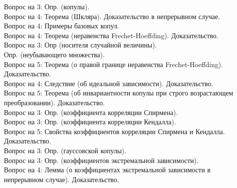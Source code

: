\documentclass[10pt]{amsart}
\begin{document}
\begin{enumerate}
\begin{enumerate}
Вопрос на 3: Опр. (копулы). \\
Вопрос на 4: Теорема (Шкляра). Доказательство в непрерывном случае. \\
Вопрос на 4: Примеры базовых копул. \\
Вопрос на 4: Теорема (неравенства Frechet-Hoeffding). Доказательство. \\
Вопрос на 3: Опр (носителя случайной величины). \\
Опр. (неубывающего множества). \\
Вопрос на 5: Теорема (о правой границе неравенства Frechet-Hoeffding).  Доказательство. \\
Вопрос на 4: Следствие (об идеальной зависимости). Доказательство. \\
Вопрос на 5: Теорема (об инвариантности копулы при строго возрастающем преобразовании). Доказательство. \\
Вопрос на 3: Опр. (коэффициента корреляции Спирмена). \\
Вопрос на 3: Опр. (коэффициента корреляции Кендалла). \\
Вопрос на 5: Свойства коэффициентов корреляции Спирмена и Кендалла. Доказательство. \\ 
Вопрос на 3: Опр. (гауссовской копулы). \\
Вопрос на 3: Опр. (коэффициентов экстремальной зависимости). \\
Вопрос на 4: Лемма (о коэффициентах экстремальной зависимости в непрерывном случае). Доказательство. \\
\end{enumerate}
    

\end{enumerate}
\end{document}
